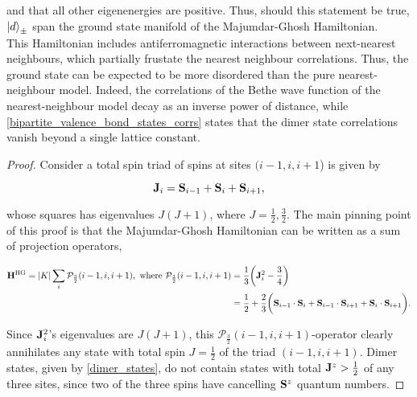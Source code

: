 and that all other eigenenergies are positive. Thus, should this statement be true, $\ket{d}_{\pm}$ span the ground state manifold of the Majumdar-Ghosh Hamiltonian. \\

This Hamiltonian includes antiferromagnetic interactions between next-nearest neighbours, which partially frustate the nearest neighbour correlations. Thus, the ground state can be expected to be more disordered than the pure nearest-neighbour model. Indeed, the correlations of the Bethe wave function of the nearest-neighbour model decay as an inverse power of distance, while  \cref{bipartite_valence_bond_states_corrs} states that the dimer state correlations vanish beyond a single lattice constant. 

\begin{proof}

Consider a total spin triad of spins at sites $(i-1, i, i+1$) is given by 

\begin{equation}
    {\bf J}_i = {\bf S}_{i-1} + {\bf S}_i + {\bf S}_{i+1},
\end{equation}

whose squares has eigenvalues $J(J+1)$, where $J = \frac{1}{2}, \frac{3}{2}$. The main pinning point of this proof is that the Majumdar-Ghosh Hamiltonian can be written as a sum of projection operators,

\begin{equation}\begin{split}
    {\bf H}^{\textnormal{HG}} = |K| \sum_{i} \mathcal{P}_{\frac{3}{2}}(i-1,i,i+1), \textnormal{ where } 
        \mathcal{P}_{\frac{3}{2}}(i-1,i,i+1) &= \frac{1}{3} \bigg({\bf J}_i^2 - \frac{3}{4}\bigg) \\
        &= \frac{1}{2} + \frac{2}{3} \bigg({\bf S}_{i-1} \cdot {\bf S}_i + {\bf S}_{i - 1} \cdot {\bf S}_{i+1} + {\bf S}_{i} \cdot {\bf S}_{i+1} \bigg). 
    \end{split}
\end{equation}

Since ${\bf J}_i^2$'s eigenvalues are $J(J+1)$, this $\mathcal{P}_{\frac{3}{2}}(i-1,i,i+1)$-operator clearly annihilates any state with total spin $J = \frac{1}{2}$ of the triad $(i-1, i, i+1)$. Dimer states, given by \cref{dimer_states}, do not contain states with total ${\bf J}^z > \frac{1}{2}$ of any three sites, since two of the three spins have cancelling ${{\bf S}}^z$ quantum numbers.


\end{proof}
